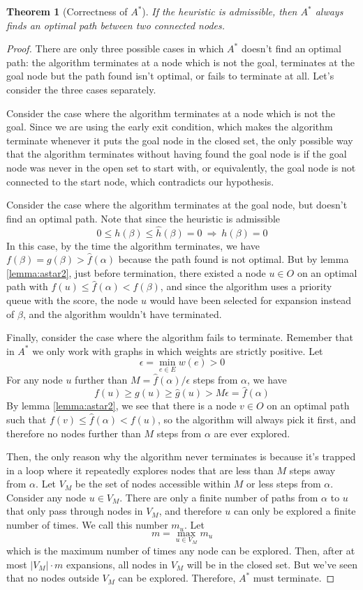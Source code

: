 \documentclass[12pt]{report}
\newtheorem{theorem}{Theorem}[chapter]
\begin{document}
\begin{theorem}[Correctness of $A^*$]
\label{thm:astar}
If the heuristic is admissible, then $A^*$ always finds an optimal path between two connected nodes.
\end{theorem}
\begin{proof}
There are only three possible cases in which $A^*$ doesn't find an optimal path: the algorithm terminates at a node which is not the goal, terminates at the goal node but the path found isn't optimal, or fails to terminate at all. Let's consider the three cases separately.

Consider the case where the algorithm terminates at a node which is not the goal. Since we are using the early exit condition, which makes the algorithm terminate whenever it puts the goal node in the closed set, the only possible way that the algorithm terminates without having found the goal node is if the goal node was never in the open set to start with, or equivalently, the goal node is not connected to the start node, which contradicts our hypothesis.

Consider the case where the algorithm terminates at the goal node, but doesn't find an optimal path. Note that since the heuristic is admissible
\[ 0 \leq h(\beta) \leq \hat{h}(\beta) = 0 \  \Rightarrow \  h(\beta) = 0 \]
In this case, by the time the algorithm terminates, we have $f(\beta) = g(\beta) > \hat{f}(\alpha)$ because the path found is not optimal. But by lemma \ref{lemma:astar2}, just before termination, there existed a node $u \in O$ on an optimal path with $f(u) \leq \hat{f}(\alpha) < f(\beta)$, and since the algorithm uses a priority queue with the score, the node $u$ would have been selected for expansion instead of $\beta$, and the algorithm wouldn't have terminated.

Finally, consider the case where the algorithm fails to terminate. Remember that in $A^*$ we only work with graphs in which weights are strictly positive. Let 
\[ \epsilon = \min_{e \in E} w(e) > 0 \]
For any node $u$ further than $M = \hat{f}(\alpha) / \epsilon$ steps from $\alpha$, we have
\[ f(u) \geq g(u) \geq \hat{g}(u) > M \epsilon = \hat{f}(\alpha) \]
By lemma \ref{lemma:astar2}, we see that there is a node $v \in O$ on an optimal path such that $f(v) \leq \hat{f}(\alpha) < f(u)$, so the algorithm will always pick it first, and therefore no nodes further than $M$ steps from $\alpha$ are ever explored.

Then, the only reason why the algorithm never terminates is because it's trapped in a loop where it repeatedly explores nodes that are less than $M$ steps away from $\alpha$. Let $V_M$ be the set of nodes accessible within $M$ or less steps from $\alpha$. Consider any node $u \in V_M$. There are only a finite number of paths from $\alpha$ to $u$ that only pass through nodes in $V_M$, and therefore $u$ can only be explored a finite number of times. We call this number $m_u$. Let
\[ m = \max_{u \in V_M} m_u \]
which is the maximum number of times any node can be explored. Then, after at most $|V_M| \cdot m$ expansions, all nodes in $V_M$ will be in the closed set. But we've seen that no nodes outside $V_M$ can be explored. Therefore, $A^*$ must terminate.
\end{proof}
\end{document}
